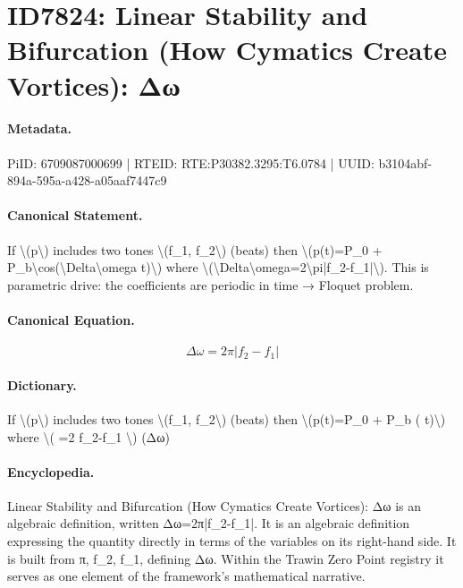 \section*{ID7824: Linear Stability and Bifurcation (How Cymatics Create Vortices): Δω}
\paragraph{Metadata.}
PiID: 6709087000699 | RTEID: RTE:P30382.3295:T6.0784 | UUID: b3104abf-894a-595a-a428-a05aaf7447c9

\paragraph{Canonical Statement.}
If \textbackslash{}(p\textbackslash{}) includes two tones \textbackslash{}(f\_1, f\_2\textbackslash{}) (beats) then \textbackslash{}(p(t)=P\_0 + P\_b\textbackslash{}cos(\textbackslash{}Delta\textbackslash{}omega t)\textbackslash{}) where \textbackslash{}(\textbackslash{}Delta\textbackslash{}omega=2\textbackslash{}pi|f\_2-f\_1|\textbackslash{}). This is parametric drive: the coefficients are periodic in time → Floquet problem.

\paragraph{Canonical Equation.}
\[
\Delta\omega=2\pi|f_2-f_1|
\]

\paragraph{Dictionary.}
If \textbackslash{}(p\textbackslash{}) includes two tones \textbackslash{}(f\_1, f\_2\textbackslash{}) (beats) then \textbackslash{}(p(t)=P\_0 + P\_b ( t)\textbackslash{}) where \textbackslash{}( =2 f\_2-f\_1 \textbackslash{}) (Δω)

\paragraph{Encyclopedia.}
Linear Stability and Bifurcation (How Cymatics Create Vortices): Δω is an algebraic definition, written Δω=2π|f\_2-f\_1|. It is an algebraic definition expressing the quantity directly in terms of the variables on its right-hand side. It is built from π, f\_2, f\_1, defining Δω. Within the Trawin Zero Point registry it serves as one element of the framework's mathematical narrative.
